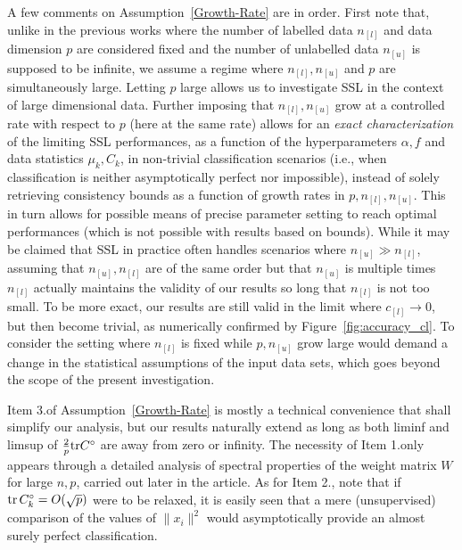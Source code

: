 \documentclass[twoside,11pt]{article}
\DeclareMathOperator{\tr}{{\rm tr}}
\begin{document}
A few comments on Assumption~\ref{Growth-Rate} are in order. First note that, unlike in the previous works \citep{nadler2009semi,globerson2017effective} where the number of labelled data $n_{[l]}$ and data dimension $p$ are considered fixed and the number of unlabelled data $n_{[u]}$ is supposed to be infinite, we assume a regime where $n_{[l]},n_{[u]}$ and $p$ are simultaneously large. Letting $p$ large allows us to investigate SSL in the context of large dimensional data. Further imposing that $n_{[l]},n_{[u]}$ grow at a controlled rate with respect to $p$ (here at the same rate) allows for an \textit{exact characterization} of the limiting SSL performances, as a function of the hyperparameters $\alpha,f$ and data statistics $\mu_k,C_k$, in non-trivial classification scenarios (i.e., when classification is neither asymptotically perfect nor impossible), instead of solely retrieving consistency bounds as a function of growth rates in $p,n_{[l]},n_{[u]}$. This in turn allows for possible means of precise parameter setting to reach optimal performances (which is not possible with results based on bounds). While it may be claimed that SSL in practice often handles scenarios where $n_{[u]}\gg n_{[l]}$, assuming that $n_{[u]},n_{[l]}$ are of the same order but that $n_{[u]}$ is multiple times $n_{[l]}$ actually maintains the validity of our results so long that $n_{[l]}$ is not too small. To be more exact, our results are still valid in the limit where $c_{[l]}\to 0$, but then become trivial, as numerically confirmed by Figure~\ref{fig:accuracy_cl}. To consider the setting where $n_{[l]}$ is fixed while $p,n_{[u]}$ grow large would demand a change in the statistical assumptions of the input data sets, which goes beyond the scope of the present investigation.

\medskip

Item 3.\@ of Assumption~\ref{Growth-Rate} is mostly a technical convenience that shall simplify our analysis, but our results naturally extend as long as both liminf and limsup of $\frac{2}{p}{\rm tr}C^{\circ}$ are away from zero or infinity. The necessity of Item 1.\@ only appears through a detailed analysis of spectral properties of the weight matrix $W$ for large $n,p$, carried out later in the article. As for Item 2.\@, note that if $\tr C_k^\circ=O(\sqrt{p})$ were to be relaxed, it is easily seen that a mere (unsupervised) comparison of the values of $\|x_i\|^2$ would asymptotically provide an almost surely perfect classification.

\medskip
\end{document}
